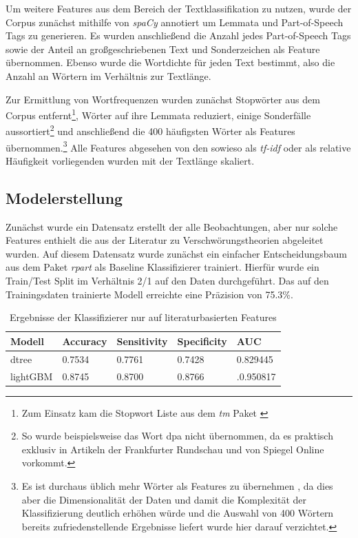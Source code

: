 Um weitere Features aus dem Bereich der Textklassifikation zu nutzen, wurde der Corpus zunächst mithilfe von \textit{spaCy} \parencite[][]{spacy} annotiert um Lemmata und Part-of-Speech Tags zu generieren.
Es wurden anschließend die Anzahl jedes Part-of-Speech Tags sowie der Anteil an großgeschriebenen Text und Sonderzeichen als Feature übernommen.
Ebenso wurde die Wortdichte für jeden Text bestimmt, also die Anzahl an Wörtern im Verhältnis zur Textlänge.

Zur Ermittlung von Wortfrequenzen wurden zunächst Stopwörter aus dem Corpus entfernt\footnote{Zum Einsatz kam die Stopwort Liste aus dem \textit{tm} Paket \parencite[][]{r-tm}}, Wörter auf ihre Lemmata reduziert, einige Sonderfälle aussortiert\footnote{So wurde beispielsweise das Wort dpa nicht übernommen, da es praktisch exklusiv in Artikeln der Frankfurter Rundschau und von Spiegel Online vorkommt.} und anschließend die 400 häufigsten Wörter als Features übernommen.\footnote{Es ist durchaus üblich mehr Wörter als Features zu übernehmen \parencite*[siehe etwa][68]{feldman_sanger_2006}, da dies aber die Dimensionalität der Daten und damit die Komplexität der Klassifizierung deutlich erhöhen würde und die Auswahl von 400 Wörtern bereits zufriedenstellende Ergebnisse liefert wurde hier darauf verzichtet.}
Alle Features abgesehen von den sowieso als \textit{tf-idf} oder als relative Häufigkeit vorliegenden wurden mit der Textlänge skaliert.

\subsection{Modelerstellung}

Zunächst wurde ein Datensatz erstellt der alle Beobachtungen, aber nur solche Features enthielt die aus der Literatur zu Verschwörungstheorien abgeleitet wurden.
Auf diesem Datensatz wurde zunächst ein einfacher Entscheidungsbaum aus dem Paket \textit{rpart} \parencite[]{rpart} als Baseline Klassifizierer trainiert.
Hierfür wurde ein Train/Test Split im Verhältnis 2/1 auf den Daten durchgeführt.
Das auf den Trainingsdaten trainierte Modell erreichte eine Präzision von 75.3\%.


\begin{table}
    \begin{center}
        \begin{tabularx}{\textwidth}{X|XXXX}
            \toprule
            Modell & Accuracy & Sensitivity & Specificity & AUC\\
            \midrule
            dtree & 0.7534 & 0.7761 & 0.7428 & 0.829445 \\
            lightGBM & 0.8745 & 0.8700 & 0.8766 & .0.950817 \\
            \bottomrule
        \end{tabularx}
        \caption{Ergebnisse der Klassifizierer nur auf literaturbasierten Features}
        \label{small-model}
    \end{center}
\end{table}


